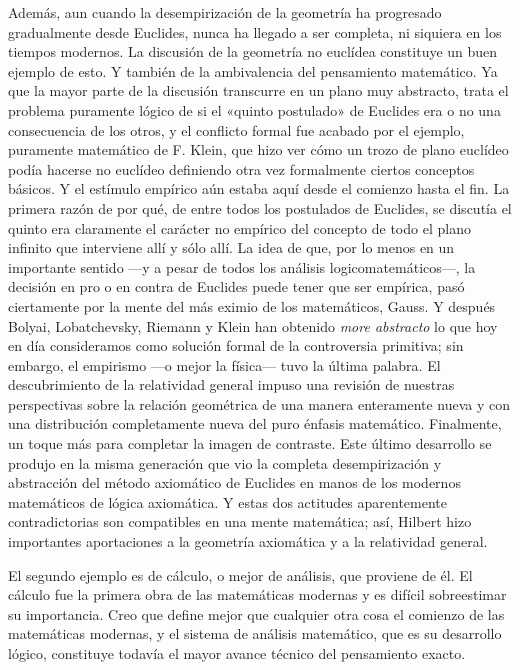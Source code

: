 \documentclass[a4paper, 12pt]{article}
\begin{document}
Además, aun cuando la desempirización de la geometría ha progresado gradualmente desde Euclides, nunca ha llegado a ser completa, ni siquiera en los tiempos modernos. La discusión de la geometría no euclídea constituye un buen ejemplo de esto. Y también de la ambivalencia del pensamiento matemático. Ya que la mayor parte de la discusión transcurre en un plano muy abstracto, trata el problema puramente lógico de si el «quinto postulado» de Euclides era o no una consecuencia de los otros, y el conflicto formal fue acabado por el ejemplo, puramente matemático de F. Klein, que hizo ver cómo un trozo de plano euclídeo podía hacerse no euclídeo definiendo otra vez formalmente ciertos conceptos básicos. Y el estímulo empírico aún estaba aquí desde el comienzo hasta el fin. La primera razón de por qué, de entre todos los postulados de Euclides, se discutía el quinto era claramente el carácter no empírico del concepto de todo el plano infinito que interviene allí y sólo allí. La idea de que, por lo menos en un importante sentido ---y a pesar de todos los análisis logicomatemáticos---, la decisión en pro o en contra de Euclides puede tener que ser empírica, pasó ciertamente por la mente del más eximio de los matemáticos, Gauss. Y después Bolyai, Lobatchevsky, Riemann y Klein han obtenido \textit{more abstracto} lo que hoy en día consideramos como solución formal de la controversia primitiva; sin embargo, el empirismo ---o mejor la física--- tuvo la última palabra. El descubrimiento de la relatividad general impuso una revisión de nuestras perspectivas sobre la relación geométrica de una manera enteramente nueva y con una distribución completamente nueva del puro énfasis matemático. Finalmente, un toque más para completar la imagen de contraste. Este último desarrollo se produjo en la misma generación que vio la completa desempirización y abstracción del método axiomático de Euclides en manos de los modernos matemáticos de lógica axiomática. Y estas dos actitudes aparentemente contradictorias son compatibles en una mente matemática; así, Hilbert hizo importantes aportaciones a la geometría axiomática y a la relatividad general.

El segundo ejemplo es de cálculo, o mejor de análisis, que proviene de él. El cálculo fue la primera obra de las matemáticas modernas y es difícil sobreestimar su importancia. Creo que define mejor que cualquier otra cosa el comienzo de
las matemáticas modernas, y el sistema de análisis matemático, que es su desarrollo lógico, constituye todavía el mayor avance técnico del pensamiento exacto.
\end{document}
